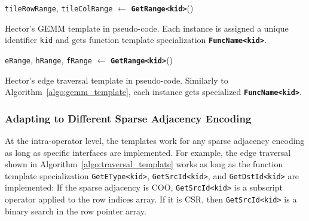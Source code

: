 \begin{algorithm}[!htbp]
{
\texttt{tileRowRange}, \texttt{tileColRange} $\gets$ \textbf{\texttt{GetRange<kid>}}()\;
}
\caption{Hector's GEMM template in pseudo-code. Each instance is assigned a unique identifier \texttt{kid} and gets function template specialization \textbf{\texttt{FuncName<kid>}}.}
\label{algo:gemm_template}
\end{algorithm}


\begin{algorithm}[!htbp]
{
\texttt{eRange}, \texttt{hRange}, \texttt{fRange} $\gets$ \textbf{\texttt{GetRange<kid>}}()\;
 {
}
}
\caption{Hector's edge traversal template in pseudo-code. Similarly to Algorithm~\ref{algo:gemm_template}, each instance gets specialized \textbf{\texttt{FuncName<kid>}}.}
\label{algo:traversal_template}
\end{algorithm}


\subsubsection{Adapting to Different Sparse Adjacency Encoding}
At the intra-operator level, the templates work for any sparse adjacency encoding as long as specific interfaces are implemented. For example, the edge traversal shown in Algorithm~\ref{algo:traversal_template} works as long as the function template specialization \texttt{GetEType<kid>}, \texttt{GetSrcId<kid>}, and \texttt{GetDstId<kid>} are implemented: If the sparse adjacency is COO, \texttt{GetSrcId<kid>} is a subscript operator applied to the row indices array. If it is CSR, then \texttt{GetSrcId<kid>} is a binary search in the row pointer array.


